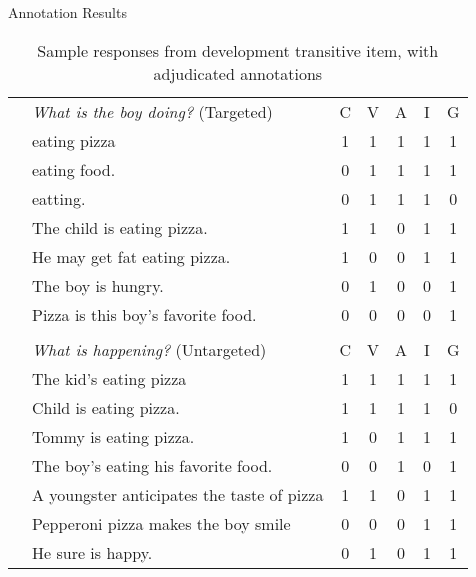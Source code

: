 \documentclass[final,14pt,t]{beamer}
\newcommand\includeneatgraphics[2][]{\addvbuffer[3pt 0pt]{\texttt{[image: \#2]}}}
\begin{document}
\begin{frame}{}
\begin{columns}[t]
\begin{column}{.33\linewidth}
\begin{minipage}[t][\textheight]{\linewidth}
\begin{block}{Annotation Results}
\begin{center}
\begin{minipage}{.85\textwidth}
\begin{table}[htb!]
\begin{center}
\setlength{\tabcolsep}{0.45em}
\begin{tabular}{|l||l|c|c|c|c|c|}
\hline
\multirow{17}{*}{\includeneatgraphics[width=0.35\columnwidth]{../figures/I02.jpg}}& \textit{What is the boy doing?} (Targeted) & C & V & A & I & G \\
\cline{2-7}
\cline{2-7}
& eating pizza & 1 & 1 & 1 & 1 & 1 \\
\cline{2-7}
& eating food. & 0 & 1 & 1 & 1 & 1 \\
\cline{2-7}
& eatting. & 0 & 1 & 1 & 1 & 0 \\
\cline{2-7}
& The child is eating pizza. & 1 & 1 & 0 & 1 & 1 \\
\cline{2-7}
& He may get fat eating pizza. & 1 & 0 & 0 & 1 & 1 \\
\cline{2-7}
& The boy is hungry. & 0 & 1 & 0 & 0 & 1 \\
\cline{2-7}
& Pizza is this boy's favorite food. & 0 & 0 & 0 & 0 & 1 \\
\cline{2-7}
& \multicolumn{6}{c|}{} \\
\cline{2-7}
& \textit{What is happening?} (Untargeted) & C & V & A & I & G \\
\cline{2-7}
\cline{2-7}
& The kid's eating pizza & 1 & 1 & 1 & 1 & 1 \\
\cline{2-7}
& Child is eating pizza. & 1 & 1 & 1 & 1 & 0 \\
\cline{2-7}
& Tommy is eating pizza. & 1 & 0 & 1 & 1 & 1 \\
\cline{2-7}
& The boy's eating his favorite food. & 0 & 0 & 1 & 0 & 1 \\
\cline{2-7}
& A youngster anticipates the taste of pizza & 1 & 1 & 0 & 1 & 1 \\
\cline{2-7}
& Pepperoni pizza makes the boy smile & 0 & 0 & 0 & 1 & 1 \\
\cline{2-7}
& He sure is happy. & 0 & 1 & 0 & 1 & 1 \\
\hline
\end{tabular}
\caption{\label{tab:devo-transitive} Sample responses from development transitive item, with adjudicated annotations} %
\end{center}
\end{table}


\end{minipage}
\end{center}
\end{block}
\end{minipage}
\end{column}
\end{columns}
\end{frame}
\end{document}
